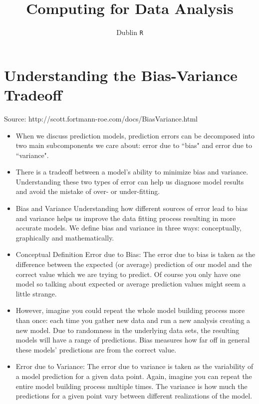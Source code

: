 \documentclass[11pt]{article} %
\title{Computing for Data Analysis}
\author{Dublin \texttt{R}}
\begin{document}
\section{Understanding the Bias-Variance Tradeoff}
Source:  http://scott.fortmann-roe.com/docs/BiasVariance.html
\begin{itemize}
\item When we discuss prediction models, prediction errors can be decomposed into two main subcomponents we care about: error due to ``bias" and error due to ``variance".  \item There is a tradeoff between a model's ability to minimize bias and variance. Understanding these two types of error can help us diagnose model results and avoid the mistake of over- or under-fitting.

\item Bias and Variance
Understanding how different sources of error lead to bias and variance helps us improve the data fitting process resulting in more accurate models. We define bias and variance in three ways: conceptually, graphically and mathematically.

\item Conceptual Definition
Error due to Bias: The error due to bias is taken as the difference between the expected (or average) prediction of our model and the correct value which we are trying to predict. Of course you only have one model so talking about expected or average prediction values might seem a little strange. 
\item However, imagine you could repeat the whole model building process more than once: each time you gather new data and run a new analysis creating a new model. Due to randomness in the underlying data sets, the resulting models will have a range of predictions. Bias measures how far off in general these models' predictions are from the correct value.
\item Error due to Variance: The error due to variance is taken as the variability of a model prediction for a given data point. Again, imagine you can repeat the entire model building process multiple times. The variance is how much the predictions for a given point vary between different realizations of the model.

\end{itemize}
\end{document}
